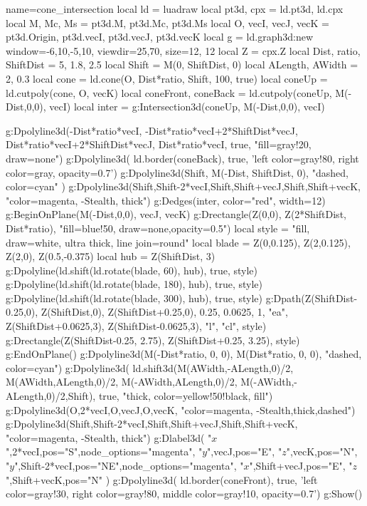 \documentclass{standalone}
\begin{document}
\begin{luadraw}{name=cone_intersection}
local ld = luadraw
local pt3d, cpx = ld.pt3d, ld.cpx
local M, Mc, Ms = pt3d.M, pt3d.Mc, pt3d.Ms
local O, vecI, vecJ, vecK = pt3d.Origin, pt3d.vecI, pt3d.vecJ, pt3d.vecK
local g = ld.graph3d:new{ window={-6,10,-5,10}, viewdir={25,70}, size={12, 12} }
local Z = cpx.Z
local Dist, ratio, ShiftDist = 5, 1.8, 2.5
local Shift = M(0, ShiftDist, 0)
local ALength, AWidth = 2, 0.3
local cone = ld.cone(O, Dist*ratio, Shift, 100, true)
local coneUp = ld.cutpoly(cone, {O, vecK}) 
local coneFront, coneBack = ld.cutpoly(coneUp, {M(-Dist,0,0), vecI})
local inter = g:Intersection3d(coneUp, {M(-Dist,0,0), vecI})

g:Dpolyline3d({-Dist*ratio*vecI, -Dist*ratio*vecI+2*ShiftDist*vecJ, Dist*ratio*vecI+2*ShiftDist*vecJ,
    Dist*ratio*vecI}, true, "fill=gray!20, draw=none")
g:Dpolyline3d( ld.border(coneBack), true, 'left color=gray!80, right color=gray, opacity=0.7')
g:Dpolyline3d({Shift, M(-Dist, ShiftDist, 0)}, "dashed, color=cyan" )
g:Dpolyline3d({{Shift,Shift-2*vecI},{Shift,Shift+vecJ},{Shift,Shift+vecK}}, "color=magenta, -Stealth, thick")
g:Dedges(inter, {color="red", width=12})
g:BeginOnPlane({M(-Dist,0,0), vecJ, vecK})
    g:Drectangle(Z(0,0), Z(2*ShiftDist, Dist*ratio), "fill=blue!50, draw=none,opacity=0.5")
    local style = "fill, draw=white, ultra thick, line join=round"
    local blade = {Z(0,0.125), Z(2,0.125), Z(2,0), Z(0.5,-0.375)}
    local hub = Z(ShiftDist, 3)
    g:Dpolyline(ld.shift(ld.rotate(blade,  60), hub), true, style)
    g:Dpolyline(ld.shift(ld.rotate(blade, 180), hub), true, style)
    g:Dpolyline(ld.shift(ld.rotate(blade, 300), hub), true, style)
    g:Dpath({Z(ShiftDist-0.25,0), Z(ShiftDist,0), Z(ShiftDist+0.25,0), 0.25, 0.0625, 1, "ea", Z(ShiftDist+0.0625,3), Z(ShiftDist-0.0625,3), "l", "cl"}, style)
    g:Drectangle(Z(ShiftDist-0.25, 2.75), Z(ShiftDist+0.25, 3.25), style)
g:EndOnPlane()
g:Dpolyline3d({M(-Dist*ratio, 0, 0), M(Dist*ratio, 0, 0)},  "dashed, color=cyan")
g:Dpolyline3d( ld.shift3d({M(AWidth,-ALength,0)/2, M(AWidth,ALength,0)/2, M(-AWidth,ALength,0)/2,
    M(-AWidth,-ALength,0)/2},Shift), true, "thick, color=yellow!50!black, fill")
g:Dpolyline3d({{O,2*vecI},{O,vecJ},{O,vecK}}, "color=magenta, -Stealth,thick,dashed")
g:Dpolyline3d({{Shift,Shift-2*vecI},{Shift,Shift+vecJ},{Shift,Shift+vecK}}, "color=magenta, -Stealth, thick")
g:Dlabel3d(
    "$x$",2*vecI,{pos="S",node_options="magenta"},
    "$y$",vecJ,{pos="E"},
    "$z$",vecK,{pos="N"},
    "$y$",Shift-2*vecI,{pos="NE",node_options="magenta"},
    "$x$",Shift+vecJ,{pos="E"},
    "$z$",Shift+vecK,{pos="N"}
)
g:Dpolyline3d( ld.border(coneFront), true, 'left color=gray!30, right color=gray!80, middle color=gray!10, opacity=0.7')
g:Show()
\end{luadraw}
\end{document}
